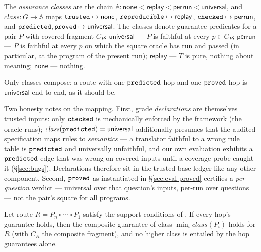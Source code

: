 \begin{definition}
\label{def:class}
The \emph{assurance classes} are the chain
$\mathbb{A} : \mathsf{none} < \mathsf{replay} < \mathsf{perrun} <
\mathsf{universal}$, and
$\mathit{class} : G \to \mathbb{A}$ maps
$\mathtt{trusted} \mapsto \mathsf{none}$,
$\mathtt{reproducible} \mapsto \mathsf{replay}$,
$\mathtt{checked} \mapsto \mathsf{perrun}$, and
$\mathtt{predicted}, \mathtt{proved} \mapsto \mathsf{universal}$.
The classes denote guarantee predicates for a pair $P$ with covered
fragment $C_P$:
$\mathsf{universal}$ --- $P$ is faithful at every $p \in C_P$;
$\mathsf{perrun}$ --- $P$ is faithful at every $p$ on which the square
oracle has run and passed (in particular, at the program of the present
run);
$\mathsf{replay}$ --- $T$ is pure, nothing about meaning;
$\mathsf{none}$ --- nothing.
\end{definition}

Only classes compose: a route with one $\mathtt{predicted}$ hop and one $\mathtt{proved}$
hop is $\mathsf{universal}$ end to end, as it should be.

Two honesty notes on the mapping. First, grade \emph{declarations} are
themselves trusted inputs: only $\mathtt{checked}$ is mechanically enforced by the
framework (the oracle runs); $\mathit{class}(\mathtt{predicted}) = \mathsf{universal}$
additionally presumes that the audited specification maps rules to
\emph{semantics} --- a translator faithful to a wrong rule table is
$\mathtt{predicted}$ and universally unfaithful, and our own evaluation exhibits a
$\mathtt{predicted}$ edge that was wrong on covered inputs until a coverage probe
caught it (\S\ref{sec:bugs}). Declarations therefore sit in the
trusted-base ledger like any other component. Second, $\mathtt{proved}$ as
instantiated in \S\ref{sec:eval-proved} certifies a \emph{per-question}
verdict --- universal over that question's inputs, per-run over
questions --- not the pair's square for all programs.

\label{sec:composition}

\begin{proposition}
\label{prop:weakestlink}
Let route $R = P_n \circ \cdots \circ P_1$ satisfy the support conditions
of . If every hop's guarantee holds, then the composite
guarantee of class $\min_i \mathit{class}(P_i)$ holds for $R$ (with
$C_R$ the composite fragment), and no higher class is entailed by the
hop guarantees alone.
\end{proposition}

